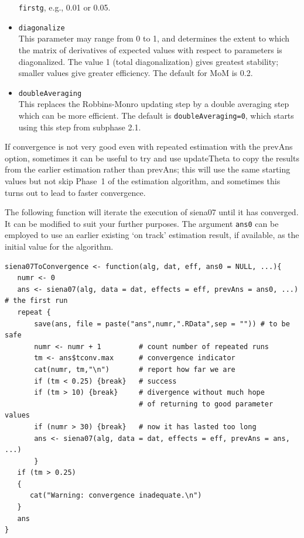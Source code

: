 \documentclass[a4paper,fleqn,11pt]{article}
\newcommand{\+}{\, + \,}
\newcommand{\sfn}[1]{\textsf{#1}}
\begin{document}
\begin{itemize}
     \texttt{firstg}, e.g., 0.01 or 0.05.
\item \texttt{diagonalize}\\
    This parameter may range from 0 to 1,
    and determines the extent to which the matrix of derivatives of expected
    values with respect to parameters is diagonalized.
    The value 1 (total diagonalization) gives greatest stability;
    smaller values give greater efficiency.
    The default for MoM is 0.2.
\item \texttt{doubleAveraging}\\
      This replaces the Robbins-Monro updating step by a double averaging
      step \citep{bather1989,SchwabeWalk96,KushnerYin03} which can be
      more efficient. The default is \texttt{doubleAveraging=0}, which starts using
      this step from subphase 2.1.
\end{itemize}


If convergence is not very good even with repeated estimation with
the \sfn{prevAns} option, sometimes it can be useful to try and use
\sfn{updateTheta} to copy the results from the earlier estimation
rather than \sfn{prevAns}; this will use the same starting values
but not skip Phase~1 of the estimation algorithm, and sometimes
this turns out to lead to faster convergence.
\medskip

The following function will
iterate the execution of \sfn{siena07} until it has converged.
It can be modified to suit your further purposes.
The argument \texttt{ans0} can be employed to use an earlier existing
`on track' estimation result, if available, as the initial value
for the algorithm.

\begin{verbatim}
siena07ToConvergence <- function(alg, dat, eff, ans0 = NULL, ...){
   numr <- 0
   ans <- siena07(alg, data = dat, effects = eff, prevAns = ans0, ...) # the first run
   repeat {
       save(ans, file = paste("ans",numr,".RData",sep = "")) # to be safe
       numr <- numr + 1         # count number of repeated runs
       tm <- ans$tconv.max      # convergence indicator
       cat(numr, tm,"\n")       # report how far we are
       if (tm < 0.25) {break}   # success
       if (tm > 10) {break}     # divergence without much hope
                                # of returning to good parameter values
       if (numr > 30) {break}   # now it has lasted too long
       ans <- siena07(alg, data = dat, effects = eff, prevAns = ans, ...)
       }
   if (tm > 0.25)
   {
      cat("Warning: convergence inadequate.\n")
   }
   ans
}
\end{verbatim}
\end{document}
